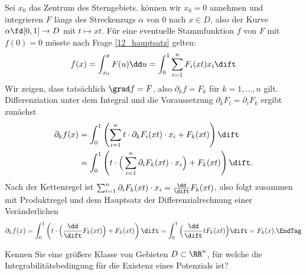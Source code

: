 \begin{antwort}
  Sei $x_0$ das Zentrum des Sterngebiets. {\OBdA} können 
  wir $x_0=0$ annehmen und integrieren $F$ längs des Streckenzugs 
  $\alpha$ von $0$ nach $x\in D$, also der Kurve 
  $\alpha\fd [0,1]\to D$ mit $t\mapsto xt$.  
  Für eine eventuelle Stammfunktion $f$ von $F$ 
  mit $f(0)=0$ müsste nach Frage \ref{12_hauptsatz} gelten: 
  \[
  f(x)=\int_{x_0}^x  F (u) \dd u = 
  \int_0^1 \sum_{i=1}^n F_i (xt) x_i \dift 
  \]
  Wir zeigen, dass tatsächlich $\grad f = F$, also 
  $\partial_k f=F_k$ für $k=1,\ldots,n$ gilt. Differen\-ziation 
  unter dem 
  Integral und die Voraussetzung $\partial_k F_i = \partial_i F_k$
  ergibt zunächst  
  \begin{align*}
    \partial_k f(x) &= 
    \int_0^1 \left( \sum_{i=1}^n t\cdot \partial_k F_i (xt) \cdot x_i + 
      F_k(xt) \right) \dift \\
    &=
    \int_0^1 \left( 
      t\cdot \Big( \sum_{i=1}^n  \partial_i F_k (xt) \cdot x_i \Big) + 
      F_k(xt) \right)  \dift.
  \end{align*}
  Nach der Kettenregel ist 
  $\sum_{i=1}^n \partial_i F_k (xt) \cdot x_i = 
  \frac{\dd}{\dift} F_k(xt)$, also 
  folgt zusammen mit Produktregel und dem Hauptsatz 
  der Differenzialrechnung einer Veränderlichen 
  \[
  \partial_k f(x) = 
  \int_0^1 \left(  t\cdot \Big( \frac{\dd}{\dift} F_k(xt) \Big) + 
    F_k(xt) \right) \dift = 
  \int_0^1 \Big( \frac{\dd}{\dift} t F_k(xt) \Big) \dift = 
  F_k(x).\EndTag
  \]
  
\end{antwort} 

\begin{frage}\label{12_einfachzus}
  Kennen Sie eine größere Klasse von Gebieten $D\subset\RR^n$, für welche die 
  Integrabilitätsbedingung  für die Existenz eines 
  Potenzials ist?
\end{frage}

